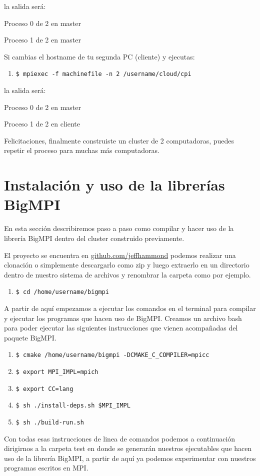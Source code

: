 \documentclass[conference]{IEEEtran}
\begin{document}
la salida será:

Proceso 0 de 2 en master

Proceso 1 de 2 en master

Si cambias el hostname de tu segunda PC (cliente) y ejecutas:
\begin{enumerate}
  \item[] \texttt{\$ mpiexec -f machinefile -n 2 \texttildelow/username/cloud/cpi}
\end{enumerate}

la salida será:

Proceso 0 de 2 en master

Proceso 1 de 2 en cliente

Felicitaciones, finalmente construiste un cluster de 2 computadoras,
puedes repetir el proceso para muchas más computadoras.

\section{Instalación y uso de la librerías BigMPI}
En esta sección describiremos paso a paso como compilar y hacer uso de la librería BigMPI
dentro del cluster construido previamente.

El proyecto se encuentra en \href{https://github.com/jeffhammond/BigMPI}{github.com/jeffhammond}
podemos realizar una clonación o simplemente descargarlo como zip y luego extraerlo en un directorio
dentro de nuestro sistema de archivos y renombrar la carpeta como por ejemplo.
\begin{enumerate}
\item[] \texttt{\$ cd /home/username/bigmpi}
\end{enumerate}
A partir de aquí empezamos a ejecutar los comandos en el terminal para compilar y ejecutar
los programas que hacen uso de BigMPI.
Creamos un archivo bash para poder ejecutar las siguientes instrucciones que vienen
acompañadas del paquete BigMPI.
\begin{enumerate}
\item[] \texttt{\$ cmake /home/username/bigmpi -DCMAKE\_C\_COMPILER=mpicc}
\item[] \texttt{\$ export MPI\_IMPL=mpich}
\item[] \texttt{\$ export CC=lang}
\item[] \texttt{\$ sh ./install-deps.sh \$MPI\_IMPL}
\item[] \texttt{\$ sh ./build-run.sh}
\end{enumerate}

Con todas esas instrucciones de linea de comandos podemos a continuación dirigirnos
a la carpeta test en donde se generarán nuestros ejecutables que hacen uso de la librería
BigMPI, a partir de aquí ya podemos experimentar con nuestros programas escritos en MPI.
\end{document}
